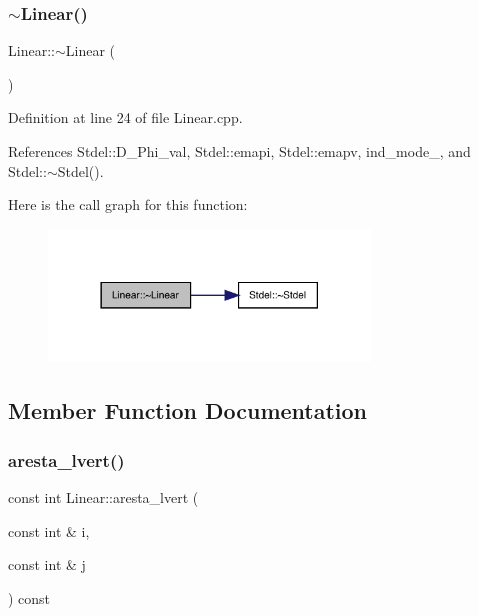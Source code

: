 \subsubsection{\texorpdfstring{$\sim$\+Linear()}{~Linear()}}
{\footnotesize\ttfamily Linear\+::$\sim$\+Linear (\begin{DoxyParamCaption}{ }\end{DoxyParamCaption})}



Definition at line 24 of file Linear.\+cpp.



References Stdel\+::\+D\+\_\+\+Phi\+\_\+val, Stdel\+::emapi, Stdel\+::emapv, ind\+\_\+mode\+\_\+, and Stdel\+::$\sim$\+Stdel().

Here is the call graph for this function\+:
\nopagebreak
\begin{figure}[H]
\begin{center}
\leavevmode
\includegraphics[width=242pt]{classLinear_a6abe6c2b55a1e1c3e838aaf82e77e627_cgraph}
\end{center}
\end{figure}


\subsection{Member Function Documentation}
\mbox{\label{classLinear_a1111d1b38590d73c38e2a09b57ed8413}} 
\subsubsection{\texorpdfstring{aresta\+\_\+lvert()}{aresta\_lvert()}}
{\footnotesize\ttfamily const int Linear\+::aresta\+\_\+lvert (\begin{DoxyParamCaption}\item[{const int \&}]{i,  }\item[{const int \&}]{j }\end{DoxyParamCaption}) const\hspace{0.3cm}{\ttfamily [virtual]}}



